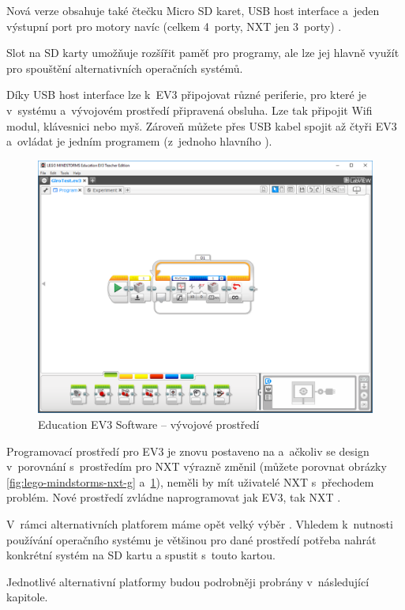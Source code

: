 
Nová verze obsahuje také čtečku Micro SD karet, USB host interface a~jeden výstupní port pro motory navíc (celkem 4~porty, NXT jen 3~porty) \cite{legoBotBench_comparing-EV3-and-NXT}. 

Slot na SD karty umožňuje rozšířit paměť pro programy, ale lze jej hlavně využít pro spouštění alternativních operačních systémů. 

Díky USB host interface lze k~EV3 připojovat různé periferie, pro které je v~systému a~vývojovém prostředí připravená obsluha.
Lze tak připojit Wifi modul, klávesnici nebo myš. 
Zároveň můžete přes USB kabel spojit až čtyři EV3  a~ovládat je jedním programem (z~jednoho hlavního ).

\begin{figure}[h]
	\centering
	\includegraphics[width=\textwidth]{images/lego-mindstorms-ev3_dev-soft.png}
	\caption[\legoM{ }Education EV3 Software -- vývojové prostředí]{\legoM{ }Education EV3 Software -- vývojové prostředí}
	\label{fig:lego-mindstorms-ev3_dev-soft}
\end{figure}

Programovací prostředí pro EV3 je znovu postaveno na \labview{ }a~ačkoliv se design v~porovnání s~prostředím pro NXT výrazně změnil (můžete porovnat obrázky \ref{fig:lego-mindstorms-nxt-g} a~\ref{fig:lego-mindstorms-ev3_dev-soft}), neměli by mít uživatelé NXT s~přechodem problém. 
Nové prostředí zvládne naprogramovat jak EV3, tak NXT \brick{}.

V~rámci alternativních platforem máme opět velký výběr \cite{legoMindstormsWikipedia_programming-languages}. 
Vhledem k~nutnosti používání operačního systému je většinou pro dané prostředí potřeba nahrát konkrétní systém na SD kartu a spustit \brick{ }s~touto kartou.

Jednotlivé alternativní platformy budou podrobněji probrány v~následující kapitole.
